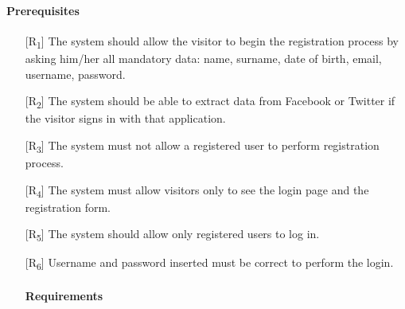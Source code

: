 \documentclass[12pt,titlepage]{article}
\begin{document}
\paragraph{Prerequisites}
\begin{itemize}
\item[{[R\textsubscript{1}]}] The system should allow the visitor to begin the registration process by asking him/her all mandatory data: name, surname, date of birth, email, username, password.
\item[{[R\textsubscript{2}]}] The system should be able to extract data from Facebook or Twitter if the visitor signs in with that application.
\item[{[R\textsubscript{3}]}] The system must not allow a registered user to perform registration process.
\item[{[R\textsubscript{4}]}] The system must allow visitors only to see the login page and the registration form.
\item[{[R\textsubscript{5}]}] The system should allow only registered users to log in.
\item[{[R\textsubscript{6}]}] Username and password inserted must be correct to perform the login.
\paragraph{Requirements}


\end{itemize}
\end{document}

